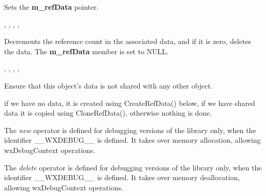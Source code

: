
Sets the {\bf m\_refData} pointer.


, , ,\rtfsp
{},\rtfsp
{}

\label{wxobjectunref}


Decrements the reference count in the associated data, and if it is zero, deletes the data.
The {\bf m\_refData} member is set to NULL.


, ,\rtfsp
{}, ,\rtfsp
{}

\label{wxobjectunshare}


Ensure that this object's data is not shared with any other object.

if we have no
data, it is created using CreateRefData() below, if we have shared data
it is copied using CloneRefData(), otherwise nothing is done.


\label{wxobjectnew}


The {\it new} operator is defined for debugging versions of the library only, when
the identifier \_\_WXDEBUG\_\_ is defined. It takes over memory allocation, allowing
wxDebugContext operations.

\label{wxobjectdelete}


The {\it delete} operator is defined for debugging versions of the library only, when
the identifier \_\_WXDEBUG\_\_ is defined. It takes over memory deallocation, allowing
wxDebugContext operations.



